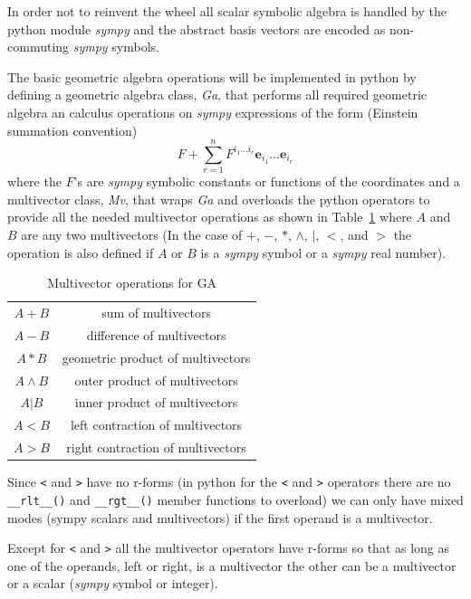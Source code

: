 \documentclass[12pt]{report}
\newcommand{\bm}[1]{\boldsymbol{#1}}
\newcommand{\W}{\wedge}
\newcommand{\be}{\begin{equation}}
\newcommand{\ee}{\end{equation}}
\newcommand{\eb}{\bm{e}}
\newcommand{\T}[1]{\texttt{#1}}
\begin{document}
In order not to reinvent the wheel all scalar symbolic algebra is handled by the
python module \emph{sympy} and the abstract basis vectors are encoded as
non-commuting \emph{sympy} symbols.

The basic geometric algebra operations will be implemented in python by defining
a geometric algebra class, {\em Ga}, that performs all required geometric algebra an
calculus operations on \emph{sympy} expressions of the form (Einstein summation convention)
\be
   F +\sum_{r=1}^{n}F^{i_{1}\dots i_{r}}\eb_{i_{1}}\dots\eb_{i_{r}}
\ee
where the $F$'s are \emph{sympy} symbolic constants or functions of the
coordinates and a multivector class, {\em Mv}, that wraps {\em Ga} and overloads the python operators to provide
all the needed multivector operations as shown in Table~\ref{ops}
 where $A$ and $B$  are any two multivectors (In the case of
$+$, $-$, $*$, $\W$, $|$, $<$, and $>$ the operation is also defined if $A$ or
$B$ is a \emph{sympy} symbol or a \emph{sympy} real number).

\begin{table}
\begin{center}
\begin{tabular}{cc}
    $A+B$ & sum of multivectors \\
    $A-B$ & difference of multivectors \\
    $A*B$ & geometric product of multivectors \\
    $A\W B$ & outer product of multivectors \\
    $A|B$ & inner product of multivectors \\
    $A<B$ & left contraction of multivectors \\
    $A>B$ & right contraction of multivectors
\end{tabular}
\end{center}
\caption{Multivector operations for GA}\label{ops}
\end{table}

Since \T{<} and \T{>} have no r-forms (in python for the \T{<} and \T{>} operators there are no \lstinline$__rlt__()$ and
 \lstinline$__rgt__()$ member functions to overload)
we can only have mixed modes (sympy scalars and multivectors) if the first operand is a multivector.


    Except for \T{<} and \T{>} all the multivector operators have r-forms so that as long as one of the
    operands, left or right, is a multivector the other can be a multivector or a scalar (\emph{sympy} symbol or integer).
\end{document}
